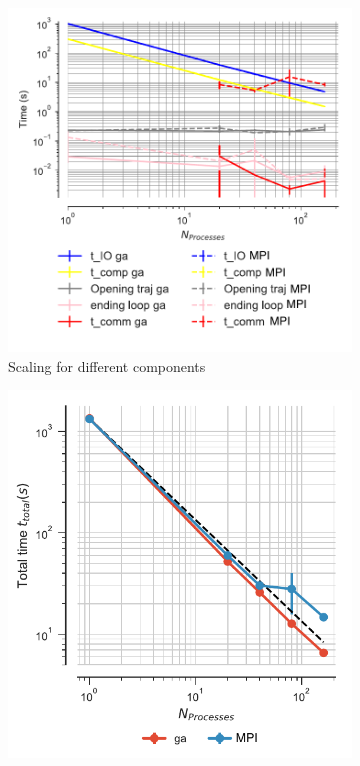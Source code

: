 \begin{figure}[!htb]
  \centering
  \begin{subfigure}{.3\textwidth}
    \includegraphics[width=\linewidth]{figures/Comparison_IO_compute_scaling_traj_splitting-SuperMIC_edited.pdf}
    \captionsetup{format=hang}
    \caption{Scaling for different components}
    \label{fig:MPIscaling-SuperMIC}
  \end{subfigure}
  \hfill
  \begin{subfigure}{.3\textwidth}
    \includegraphics[width=\linewidth]{figures/Comparison_tot_time_traj_splitting-SuperMIC_edited.pdf}

\end{subfigure}
\end{figure}
